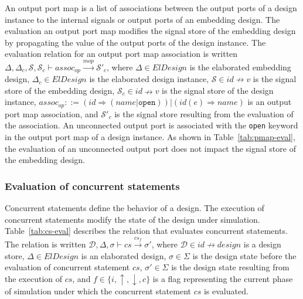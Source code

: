 \documentclass[pdflatex,sn-mathphys]{sn-jnl}%
\theoremstyle{thmstyleone}%
\theoremstyle{thmstyletwo}%
\theoremstyle{thmstylethree}%
\begin{document}
An output port map is a list of associations between the output ports
of a design instance to the internal signals or output ports of an
embedding design.  The evaluation an output port map modifies the
signal store of the embedding design by propagating the value of the
output ports of the design instance. The evaluation relation for an
output port map association is written
$\Delta,\Delta_c,\mathcal{S},\mathcal{S}_c\vdash{}assoc_{op}\xrightarrow{mop}\mathcal{S}'_c$,
where $\Delta\in{}ElDesign$ is the elaborated embedding design,
$\Delta_c\in{}ElDesign$ is the elaborated design instance,
$\mathcal{S}\in{}id\nrightarrow{}v$ is the signal store of the
embedding design, $\mathcal{S}_c\in{}id\nrightarrow{}v$ is the signal
store of the design instance,
$assoc_{op}::=(id\Rightarrow{}(name|\mathtt{open}))\big|(id(e)\Rightarrow{}name)$
is an output port map association, and $\mathcal{S}'_c$ is the signal
store resulting from the evaluation of the association. An unconnected
output port is associated with the \texttt{open} keyword in the output
port map of a design instance.  As shown in Table~\ref{tab:pmap-eval},
the evaluation of an unconnected output port does not impact the
signal store of the embedding design.

\subsubsection{Evaluation of concurrent statements}
\label{subsubsec:cs-eval}

Concurrent statements define the behavior of a \hvhdl{} design. The
execution of concurrent statements modify the state of the \hvhdl{}
design under simulation. Table~\ref{tab:cs-eval} describes the
relation that evaluates concurrent statements. The relation is written
$\mathcal{D},\Delta,\sigma\vdash{}cs\xrightarrow{cs_f}\sigma'$, where
$\mathcal{D}\in{}id\nrightarrow{}design$ is a design store,
$\Delta\in{}ElDesign$ is an elaborated design, $\sigma\in\Sigma$ is
the design state before the evaluation of concurrent statement $cs$,
$\sigma'\in\Sigma$ is the design state resulting from the execution of
$cs$, and $f\in\{i,\uparrow,\downarrow,c\}$ is a flag representing the
current phase of simulation under which the concurrent statement $cs$
is evaluated.
\end{document}
